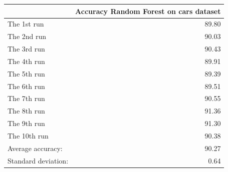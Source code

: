 \begin{tabular}{lr}
\toprule
{} &  Accuracy Random Forest on cars dataset \\
\midrule
The 1st run         &                                   89.80 \\
The 2nd run         &                                   90.03 \\
The 3rd run         &                                   90.43 \\
The 4th run         &                                   89.91 \\
The 5th run         &                                   89.39 \\
The 6th run         &                                   89.51 \\
The 7th run         &                                   90.55 \\
The 8th run         &                                   91.36 \\
The 9th run         &                                   91.30 \\
The 10th run        &                                   90.38 \\
Average accuracy:   &                                   90.27 \\
Standard deviation: &                                    0.64 \\
\bottomrule
\end{tabular}
